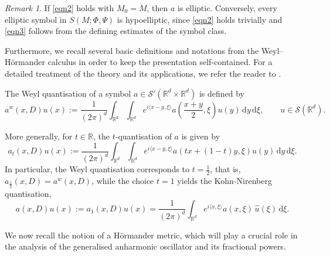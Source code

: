 \documentclass[12pt,reqno,a4paper]{amsart}
\numberwithin{equation}{section}
\theoremstyle{plain}
\theoremstyle{definition}
\theoremstyle{remark}
\newtheorem{remark}[theorem]{Remark}
\begin{document}
\begin{remark}
\label{remark}
If \eqref{eqn2} holds with $M_0=M$, then $a$ is elliptic.
Conversely, every elliptic symbol in $S(M;\Phi,\Psi)$ is hypoelliptic, since
\eqref{eqn2} holds trivially and \eqref{eqn3} follows from the defining estimates
of the symbol class.
\end{remark}



Furthermore, we recall several basic definitions and notations from the Weyl--H\"ormander calculus in order to keep the presentation self-contained. For a detailed treatment of the theory and its applications, we refer the reader to \cite{MR2304165,MR2599384,MR1011988, dasgupta2026phase}.

The Weyl quantisation of a symbol
$a\in\mathcal{S}'(\mathbb{R}^d\times\mathbb{R}^d)$
is defined by
\[
a^{w}(x,D)u(x)
:= \frac{1}{(2\pi)^d}
\int_{\mathbb{R}^d}\int_{\mathbb{R}^d}
e^{i\langle x-y,\xi\rangle}
a\!\left(\frac{x+y}{2},\xi\right)
u(y)\,\mathrm{d}y\,\mathrm{d}\xi,
\qquad u\in\mathcal{S}(\mathbb{R}^d).
\]

More generally, for $t\in\mathbb{R}$, the $t$-quantisation of $a$ is given by
\[
a_t(x,D)u(x)
:= \frac{1}{(2\pi)^d}
\int_{\mathbb{R}^d}\int_{\mathbb{R}^d}
e^{i\langle x-y,\xi\rangle}
a(tx+(1-t)y,\xi)
u(y)\,\mathrm{d}y\,\mathrm{d}\xi.
\]
In particular, the Weyl quantisation corresponds to $t=\frac12$, that is,
$a_{\frac12}(x,D)=a^{w}(x,D)$, while the choice $t=1$ yields the
Kohn-Nirenberg quantisation,
\[
a(x,D)u(x)
:= a_1(x,D)u(x)
= \frac{1}{(2\pi)^d}
\int_{\mathbb{R}^d}
e^{i\langle x,\xi\rangle}
a(x,\xi)\,\widehat{u}(\xi)\,\mathrm{d}\xi.
\]

We now recall the notion of a H\"ormander metric, which will play a crucial
role in the analysis of the generalised anharmonic oscillator and its
fractional powers.
\end{document}
